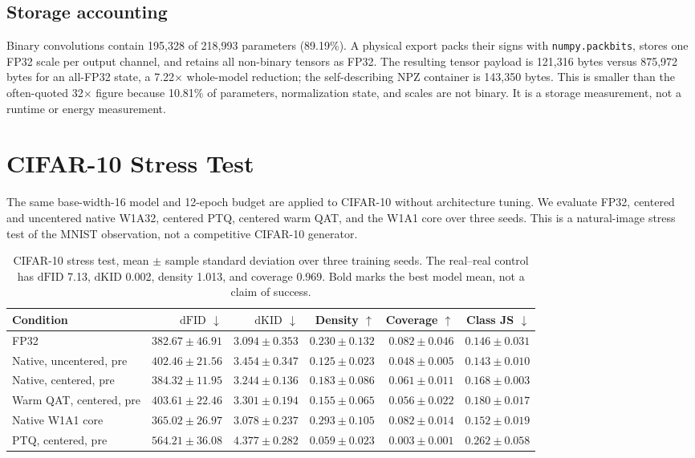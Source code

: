 \documentclass[conference]{IEEEtran}
\newcommand{\dfid}{\ensuremath{\mathrm{dFID}}}
\newcommand{\dkid}{\ensuremath{\mathrm{dKID}}}
\begin{document}
\subsection{Storage accounting}

Binary convolutions contain 195,328 of 218,993 parameters (89.19\%). A physical
export packs their signs with \texttt{numpy.packbits}, stores one FP32 scale per
output channel, and retains all non-binary tensors as FP32. The resulting tensor
payload is 121,316 bytes versus 875,972 bytes for an all-FP32 state, a 7.22$\times$
whole-model reduction; the self-describing NPZ container is 143,350 bytes. This
is smaller than the often-quoted 32$\times$ figure because 10.81\% of parameters,
normalization state, and scales are not binary. It is a storage measurement, not
a runtime or energy measurement.

\section{CIFAR-10 Stress Test}

The same base-width-16 model and 12-epoch budget are applied to CIFAR-10 without
architecture tuning. We evaluate FP32, centered and uncentered native W1A32,
centered PTQ, centered warm QAT, and the W1A1 core over three seeds. This is a
natural-image stress test of the MNIST observation, not a competitive CIFAR-10
generator.

\begin{table}[t]
\centering
\caption{CIFAR-10 stress test, mean $\pm$ sample standard deviation over three
training seeds. The real--real control has \dfid{} 7.13, \dkid{} 0.002, density
1.013, and coverage 0.969. Bold marks the best model mean, not a claim of success.}
\label{tab:cifar}
\small
\begin{tabular}{lrrrrr}
\toprule
Condition & \dfid{} $\downarrow$ & \dkid{} $\downarrow$ & Density $\uparrow$ & Coverage $\uparrow$ & Class JS $\downarrow$ \\
\midrule
FP32 & $382.67\pm46.91$ & $3.094\pm0.353$ & $0.230\pm0.132$ & $0.082\pm0.046$ & $0.146\pm0.031$ \\
Native, uncentered, pre & $402.46\pm21.56$ & $3.454\pm0.347$ & $0.125\pm0.023$ & $0.048\pm0.005$ & $\mathbf{0.143\pm0.010}$ \\
Native, centered, pre & $384.32\pm11.95$ & $3.244\pm0.136$ & $0.183\pm0.086$ & $0.061\pm0.011$ & $0.168\pm0.003$ \\
Warm QAT, centered, pre & $403.61\pm22.46$ & $3.301\pm0.194$ & $0.155\pm0.065$ & $0.056\pm0.022$ & $0.180\pm0.017$ \\
Native W1A1 core & $\mathbf{365.02\pm26.97}$ & $\mathbf{3.078\pm0.237}$ & $\mathbf{0.293\pm0.105}$ & $\mathbf{0.082\pm0.014}$ & $0.152\pm0.019$ \\
PTQ, centered, pre & $564.21\pm36.08$ & $4.377\pm0.282$ & $0.059\pm0.023$ & $0.003\pm0.001$ & $0.262\pm0.058$ \\
\bottomrule
\end{tabular}
\end{table}
\end{document}
